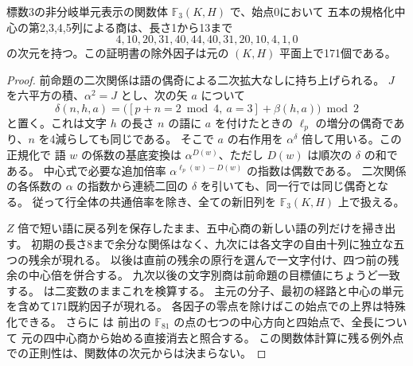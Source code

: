 \begin{proposition}\label{prop:ordinary-bivariate-border-cut}
標数3の非分岐単元表示の関数体 $\mathbb F_3(K,H)$ で、始点0において
五本の規格化中心の第2,3,4,5列による商は、長さ1から13まで
\[
               4,10,20,31,40,44,40,31,20,10,4,1,0
\]
の次元を持つ。この証明書の除外因子は元の $(K,H)$ 平面上で171個である。
\end{proposition}
\begin{proof}
前命題の二次関係は語の偶奇による二次拡大なしに持ち上げられる。
$J$ を六平方の積、$\alpha^2=J$ とし、次の矢 $a$ について
\[
 \delta(n,h,a)=\bigl([p+n=2\bmod4,\ a=3]+\beta(h,a)\bigr)\bmod2
\]
と置く。これは文字 $h$ の長さ $n$ の語に $a$ を付けたときの
$\ell_p$ の増分の偶奇であり、$n$ を4減らしても同じである。
そこで $a$ の右作用を $\alpha^\delta$ 倍して用いる。この正規化で
語 $w$ の係数の基底変換は $\alpha^{D(w)}$、ただし $D(w)$ は順次の $\delta$ の和である。
中心式で必要な追加倍率 $\alpha^{\ell_p(w)-D(w)}$ の指数は偶数である。
二次関係の各係数の $\alpha$ の指数から連続二回の $\delta$ を引いても、同一行では同じ偶奇となる。
従って行全体の共通倍率を除き、全ての新旧列を $\mathbb F_3(K,H)$ 上で扱える。

$Z$ 倍で短い語に戻る列を保存したまま、五中心商の新しい語の列だけを掃き出す。
初期の長さ8まで余分な関係はなく、九次には各文字の自由十列に独立な五つの残余が現れる。
以後は直前の残余の原行を選んで一文字付け、四つ前の残余の中心倍を併合する。
九次以後の文字別商は前命題の目標値にちょうど一致する。
 は二変数のままこれを検算する。
主元の分子、最初の経路と中心の単元を含めて171既約因子が現れる。
各因子の零点を除けばこの始点での上界は特殊化できる。
さらに  は
前出の $\mathbb F_{81}$ の点の七つの中心方向と四始点で、全長について
元の四中心商から始める直接消去と照合する。
この関数体計算に残る例外点での正則性は、関数体の次元からは決まらない。
\end{proof}
